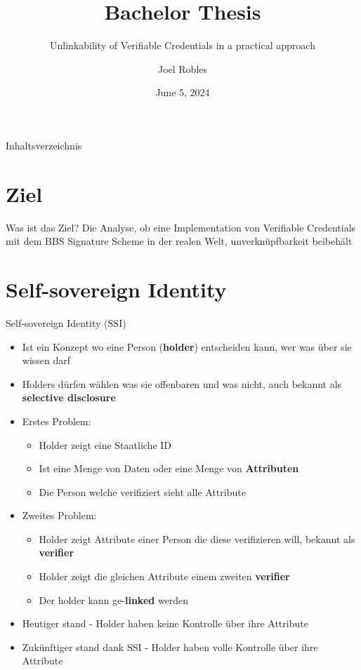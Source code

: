 \documentclass[
	german,%
	authorontitle=true,
	]{bfhbeamer}
\title{Bachelor Thesis}
\subtitle{Unlinkability of Verifiable Credentials in a practical approach}
\author[J. Robles]{Joel Robles}
\institute{TI}
\date{June 5, 2024}
\begin{document}
\maketitle

\begin{frame}{Inhaltsverzeichnis}
    \tableofcontents
\end{frame}

\section{Ziel}

\begin{frame}{Was ist das Ziel?}
    \centering
    Die Analyse, ob eine Implementation von Verifiable Credentials mit dem BBS Signature Scheme in der realen Welt, unverknüpfbarkeit beibehält
\end{frame}

\section{Self-sovereign Identity}

\begin{frame}{Self-sovereign Identity (SSI)}
    \begin{itemize}
        \item Ist ein Konzept wo eine Person (\textbf{holder}) entscheiden kann, wer was über sie wissen darf
        \item Holders dürfen wählen was sie offenbaren und was nicht, auch bekannt als \textbf{selective disclosure}
        \item Erstes Problem:
        \begin{itemize}
            \item Holder zeigt eine Staatliche ID
            \item Ist eine Menge von Daten oder eine Menge von \textbf{Attributen}
            \item Die Person welche verifiziert sieht alle Attribute
        \end{itemize}
        \item Zweites Problem:
        \begin{itemize}
            \item Holder zeigt Attribute einer Person die diese verifizieren will, bekannt als \textbf{verifier}
            \item Holder zeigt die gleichen Attribute einem zweiten \textbf{verifier}
            \item Der holder kann ge-\textbf{linked} werden
        \end{itemize}
        \item Heutiger stand - Holder haben keine Kontrolle über ihre Attribute
        \item Zukünftiger stand dank SSI - Holder haben volle Kontrolle über ihre Attribute
    \end{itemize}
\end{frame}
\end{document}
